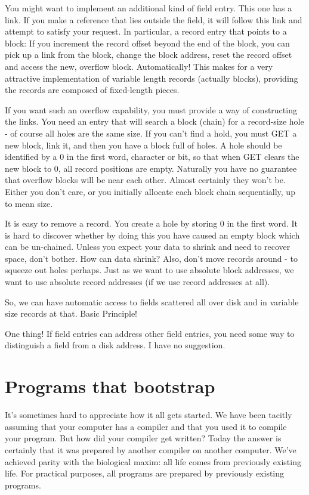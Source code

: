 \documentclass[b5paper, oneside]{book}
\begin{document}
You might want to implement an additional kind of field entry. This one has a link. If you make a reference that lies outside the field, it will follow this link and attempt to satisfy your request. In particular, a record entry that points to a block: If you increment the record offset beyond the end of the block, you can pick up a link from the block, change the block address, reset the record offset and access the new, overflow block. Automatically! This makes for a very attractive implementation of variable length records (actually blocks), providing the records are composed of fixed-length pieces.

If you want such an overflow capability, you must provide a way of constructing the links. You need an entry that will search a block (chain) for a record-size hole - of course all holes are the same size. If you can't find a hold, you must GET a new block, link it, and then you have a block full of holes. A hole should be identified by a 0 in the first word, character or bit, so that when GET clears the new block to 0, all record positions are empty. Naturally you have no guarantee that overflow blocks will be near each other. Almost certainly they won't be. Either you don't care, or you initially allocate each block chain sequentially, up to mean size.

It is easy to remove a record. You create a hole by storing 0 in the first word. It is hard to discover whether by doing this you have caused an empty block which can be un-chained. Unless you expect your data to shrink and need to recover space, don't bother. How can data shrink? Also, don't move records around - to squeeze out holes perhaps. Just as we want to use absolute block addresses, we want to use absolute record addresses (if we use record addresses at all).

So, we can have automatic access to fields scattered all over disk and in variable size records at that. Basic Principle!

One thing! If field entries can address other field entries, you need some way to distinguish a field from a disk address. I have no suggestion.



\chapter{Programs that bootstrap}
It's sometimes hard to appreciate how it all gets started. We have been tacitly assuming that your computer has a compiler and that you used it to compile your program. But how did your compiler get written? Today the answer is certainly that it was prepared by another compiler on another computer. We've achieved parity with the biological maxim: all life comes from previously existing life. For practical purposes, all programs are prepared by previously existing programs.
\end{document}
